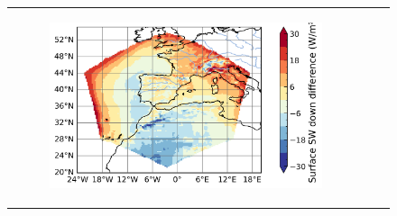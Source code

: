 \begin{figure}[htbp]
\begin{tabular}{ccc}
\begin{subfigure}[b]{0.33\textwidth}
            \includegraphics[width=\textwidth]{images/chap4/domain_size/diff_map_SWdnSFC_era_LAM_2000km_NBP80.png}
        \end{subfigure} \\
        

\end{tabular}
\end{figure}
